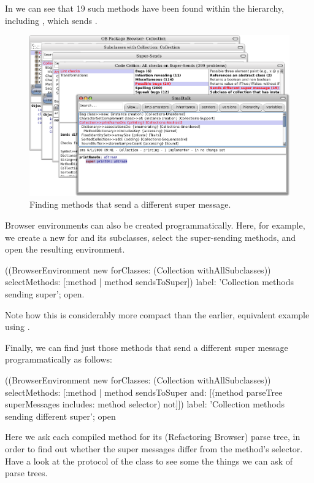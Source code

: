 \documentclass[a4paper,10pt,twoside]{book}
\begin{document}
In  we can see that 19 such methods have been found within the  hierarchy, including , which sends .
\begin{figure}[ht]\centering
	\includegraphics[width=\linewidth]{sendDifferentSuper}
	\caption{Finding methods that send a different super message.}
\end{figure}

Browser environments can also be created programmatically.
Here, for example, we create a new  for  and its subclasses, select the super-sending methods, and open the resulting environment.
\begin{code}{}
((BrowserEnvironment new forClasses: (Collection withAllSubclasses))
	selectMethods: [:method | method sendsToSuper])
	label: 'Collection methods sending super';
	open.
\end{code}{}

Note how this is considerably more compact than the earlier, equivalent example using .

Finally, we can find just those methods that send a different super message programmatically as follows:
\begin{code}{}
((BrowserEnvironment new forClasses: (Collection withAllSubclasses))
	selectMethods: [:method | 
		method sendsToSuper
		and: [(method parseTree superMessages includes: method selector) not]])
	label: 'Collection methods sending different super';
	open
\end{code}
Here we ask each compiled method for its (Refactoring Browser) parse tree, in order to find out whether the super messages differ from the method's selector.
Have a look at the  protocol of the class  to see some the things we can ask of parse trees.
\end{document}
